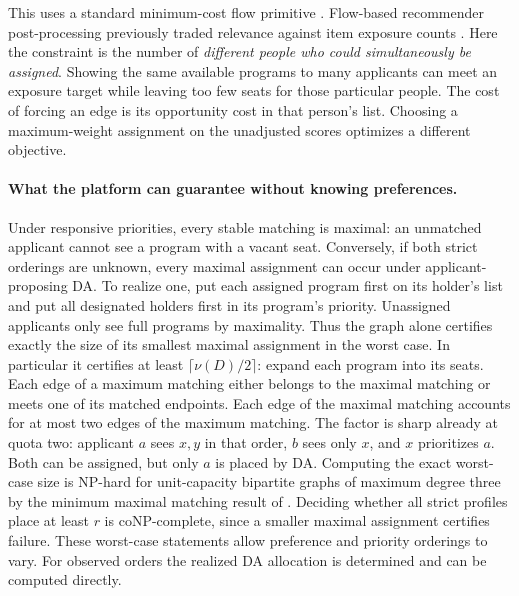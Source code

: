 This uses a standard minimum-cost flow primitive \citep{ahuja1993flows}. Flow-based recommender post-processing previously traded relevance against item exposure counts \citep{antik2017}. Here the constraint is the number of \emph{different people who could simultaneously be assigned}. Showing the same available programs to many applicants can meet an exposure target while leaving too few seats for those particular people. The cost of forcing an edge is its opportunity cost in that person's list. Choosing a maximum-weight assignment on the unadjusted scores optimizes a different objective.

\paragraph{What the platform can guarantee without knowing preferences.}
Under responsive priorities, every stable matching is maximal: an unmatched applicant cannot see a program with a vacant seat. Conversely, if both strict orderings are unknown, every maximal assignment can occur under applicant-proposing DA. To realize one, put each assigned program first on its holder's list and put all designated holders first in its program's priority. Unassigned applicants only see full programs by maximality. Thus the graph alone certifies exactly the size of its smallest maximal assignment in the worst case. In particular it certifies at least $\lceil\nu(D)/2\rceil$: expand each program into its seats. Each edge of a maximum matching either belongs to the maximal matching or meets one of its matched endpoints. Each edge of the maximal matching accounts for at most two edges of the maximum matching. The factor is sharp already at quota two: applicant $a$ sees $x,y$ in that order, $b$ sees only $x$, and $x$ prioritizes $a$. Both can be assigned, but only $a$ is placed by DA. Computing the exact worst-case size is NP-hard for unit-capacity bipartite graphs of maximum degree three by the minimum maximal matching result of \citet{yannakakis1980}. Deciding whether all strict profiles place at least $r$ is coNP-complete, since a smaller maximal assignment certifies failure. These worst-case statements allow preference and priority orderings to vary. For observed orders the realized DA allocation is determined and can be computed directly.
